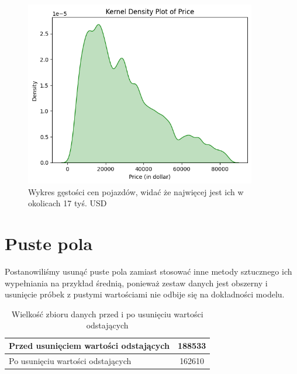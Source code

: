\documentclass[12pt, a4paper]{report}
\begin{document}
    \begin{figure}[H]
    \centering
    \includegraphics[width=0.9\textwidth]{images/density_price.png}
    \caption{Wykres gęstości cen pojazdów, widać że najwięcej jest ich w okolicach 17 tyś. USD}
    \end{figure}
\section{Puste pola}
    Postanowiliśmy usunąć puste pola zamiast stosować inne metody sztucznego ich wypełniania na przykład średnią, ponieważ zestaw danych jest obszerny i usunięcie próbek z pustymi wartościami nie odbije się na dokładności modelu.
\begin{table}[h!]
\centering
\begin{tabular}{|l|c|}
\hline
Przed usunięciem wartości odstających   & 188533 \\ \hline
Po usunięciu wartości odstających       & 162610 \\ \hline
\end{tabular}
\caption{Wielkość zbioru danych przed i po usunięciu wartości odstających}
\label{tab:wielkosc_zbioru}
\end{table}
    
\end{document}
